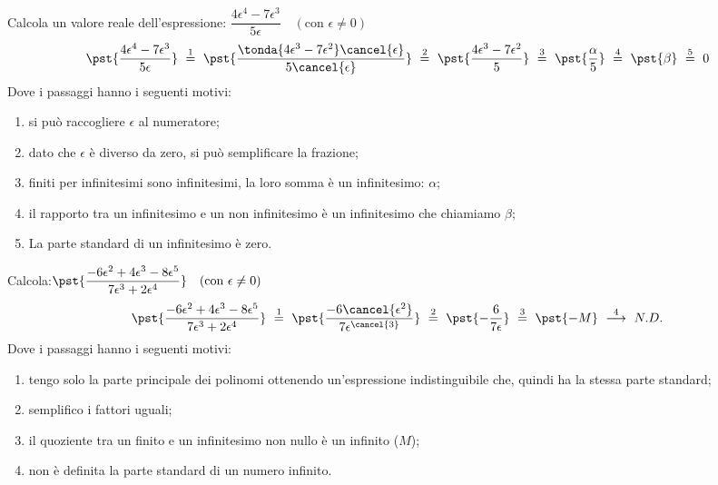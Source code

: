 \begin{esempio}
Calcola un valore reale dell'espressione: \quad
\(\dfrac{4 \epsilon^4 -7 \epsilon^3}{5 \epsilon}\quad (\text{con }\epsilon \ne 0)\) \
\[\pst{\dfrac{4 \epsilon^4 -7 \epsilon^3}{5 \epsilon}} 
~ \stackrel{1}{=} ~
  \pst{\dfrac{\tonda{4 \epsilon^3 -7 \epsilon^2} \cancel{\epsilon}}
                    {5 \cancel{\epsilon}}} 
~ \stackrel{2}{=} ~ 
  \pst{\dfrac{4 \epsilon^3 -7 \epsilon^2}{5}}
~ \stackrel{3}{=} ~
  \pst{\dfrac{\alpha}{5}}
~ \stackrel{4}{=} ~
  \pst{\beta}
~ \stackrel{5}{=} ~
  0\]
Dove i passaggi hanno i seguenti motivi:
\begin{enumerate} [nosep]
 \item si può raccogliere \(\epsilon\) al numeratore; 
 \item dato che \(\epsilon\) è diverso da zero, si può semplificare la 
frazione; 
 \item finiti per infinitesimi sono infinitesimi, la loro
somma è un infinitesimo: \(\alpha\);
 \item il rapporto tra un infinitesimo e un non infinitesimo è un 
infinitesimo che chiamiamo \(\beta\);
 \item La parte standard di un infinitesimo è zero. 
\end{enumerate}
\end{esempio}

\begin{esempio}
Calcola:\quad \(\pst{\dfrac{-6\epsilon^2 +4 \epsilon^3 -8 \epsilon^5}
             {7\epsilon^3 + 2 \epsilon^4}}\quad (\text{con }\epsilon \ne 0)\)
\[\pst{\dfrac{-6\epsilon^2 +4 \epsilon^3 -8 \epsilon^5}
             {7\epsilon^3 + 2 \epsilon^4}} 
~ \stackrel{1}{=} ~
  \pst{\dfrac{-6\cancel{\epsilon^2}}
             {7\epsilon^{\cancel{3}}}} 
~ \stackrel{2}{=} ~
  \pst{-\dfrac{6}{7\epsilon}}  
~ \stackrel{3}{=} ~
  \pst{-M} 
~ \stackrel{4}{\longrightarrow} ~
  N.D.\]
Dove i passaggi hanno i seguenti motivi:
\begin{enumerate} [nosep]
 \item tengo solo la parte principale dei polinomi ottenendo un'espressione 
indistinguibile che, quindi ha la stessa parte standard;
 \item semplifico i fattori uguali;
 \item il quoziente tra un finito e un infinitesimo non nullo è un 
infinito (\(M\));
 \item non è definita la parte standard di un numero infinito.
\end{enumerate}
\begin{osservazione}
\end{osservazione}
\end{esempio}

